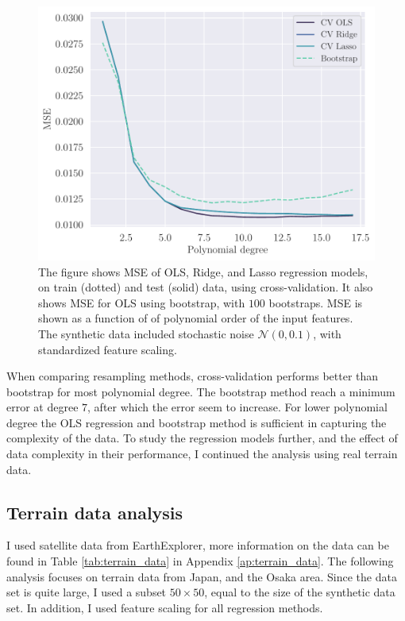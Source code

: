 \begin{figure}[h]
    \centering
    \includegraphics[width=\linewidth]{project-1/latex/figures/ols_bs_crossval_10_N50.pdf}
    \caption{The figure shows MSE of OLS, Ridge, and Lasso regression models, on train (dotted) and test (solid) data, using cross-validation. It also shows MSE for OLS using bootstrap, with $100$ bootstraps. MSE is shown as a function of of polynomial order of the input features. The synthetic data included stochastic noise $\mathcal{N}(0, 0.1)$, with standardized feature scaling.}
    \label{fig:crossval}
\end{figure}
When comparing resampling methods, cross-validation performs better than bootstrap for most polynomial degree. The bootstrap method reach a minimum error at degree $7$, after which the error seem to increase. For lower polynomial degree the OLS regression and bootstrap method is sufficient in capturing the complexity of the data. To study the regression models further, and the effect of data complexity in their performance, I continued the analysis using real terrain data.

\subsection{Terrain data analysis}\label{ssec:terrain_data}
I used satellite data from EarthExplorer, more information on the data can be found in Table \ref{tab:terrain_data} in Appendix \ref{ap:terrain_data}. The following analysis focuses on terrain data from Japan, and the Osaka area. Since the data set is quite large, I used a subset $50 \times 50$, equal to the size of the synthetic data set. In addition, I used feature scaling for all regression methods.

